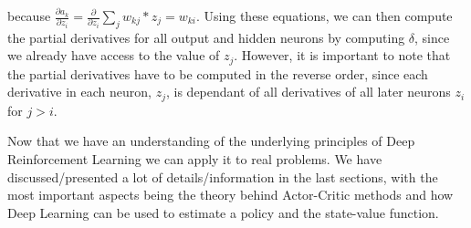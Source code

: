 \documentclass[11pt]{article}
\begin{document}
because $\frac{\partial a_k}{\partial z_i} = \frac{\partial}{\partial z_i} \sum_{j} w_{kj} * z_j = w_{ki}$.
Using these equations, we can then compute the partial derivatives for all output and hidden neurons
by computing $\delta$, since we already have access to the value of $z_j$.
However, it is important to note that the partial derivatives have to be computed in the reverse order,
since each derivative in each neuron, $z_j$, is dependant of all derivatives of all later neurons $z_i$ for $j > i$.



Now that we have an understanding of the underlying principles of Deep
Reinforcement Learning we can apply it to real problems.
We have discussed/presented a lot of details/information in
the last sections, with the most important aspects being the theory behind
Actor-Critic methods and how Deep Learning can be used to estimate
a policy and the state-value function.
\end{document}
